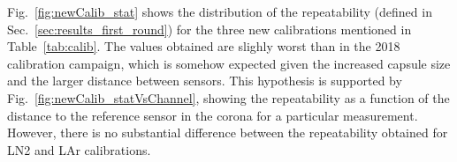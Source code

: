 Fig.~\ref{fig:newCalib_stat} shows the distribution of the repeatability (defined in Sec.~\ref{sec:results_first_round}) for the three new calibrations mentioned in Table~\ref{tab:calib}. The values obtained are slighly worst than in the 2018 calibration campaign, which is somehow expected given the increased capsule size and the larger distance between sensors. This hypothesis is supported by Fig.~\ref{fig:newCalib_statVsChannel}, showing the repeatability as a function of the distance to the reference sensor in the corona for a particular measurement. However, there is no substantial difference between the repeatability obtained for LN2 and LAr calibrations.



